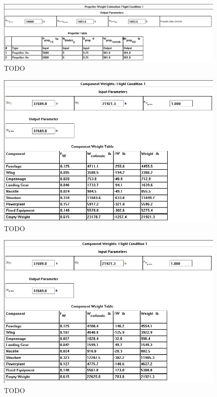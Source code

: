 \documentclass[conf]{new-aiaa}
\begin{document}
\begin{figure}
    \includegraphics[width=\textwidth]{Report3Printouts/Weight/PropellerWeight_cropped.png}
    \caption{TODO}
    \label{fig:TODO}
\end{figure}


\begin{figure}
    \includegraphics[width=\textwidth]{Report3Printouts/Weight/WeightFractionsFinal_cropped.png}
    \caption{TODO}
    \label{fig:TODO}
\end{figure}


\begin{figure}
    \includegraphics[width=\textwidth]{Report3Printouts/Weight/WeightFractionsInitial_cropped.png}
    \caption{TODO}
    \label{fig:TODO}
\end{figure}
\end{document}
